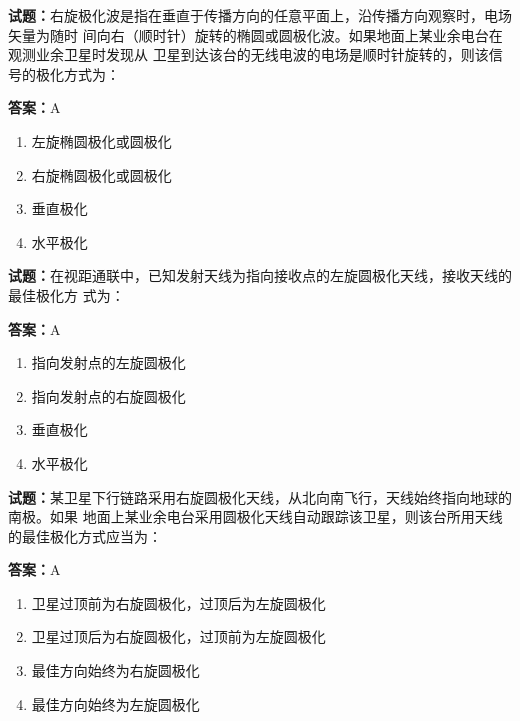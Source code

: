 \documentclass{ctexbook}
\begin{document}
\textbf{试题：}右旋极化波是指在垂直于传播方向的任意平面上，沿传播方向观察时，电场矢量为随时
间向右（顺时针）旋转的椭圆或圆极化波。如果地面上某业余电台在观测业余卫星时发现从
卫星到达该台的无线电波的电场是顺时针旋转的，则该信号的极化方式为： 

\textbf{答案：}A 

\begin{enumerate}[leftmargin=3em]
  \item 左旋椭圆极化或圆极化 

  \item 右旋椭圆极化或圆极化 

  \item 垂直极化 

  \item 水平极化 

\end{enumerate}





\vspace{1em}

\textbf{试题：}在视距通联中，已知发射天线为指向接收点的左旋圆极化天线，接收天线的最佳极化方
式为： 

\textbf{答案：}A 

\begin{enumerate}[leftmargin=3em]
  \item 指向发射点的左旋圆极化 

  \item 指向发射点的右旋圆极化 

  \item 垂直极化 

  \item 水平极化 

\end{enumerate}





\vspace{1em}

\textbf{试题：}某卫星下行链路采用右旋圆极化天线，从北向南飞行，天线始终指向地球的南极。如果
地面上某业余电台采用圆极化天线自动跟踪该卫星，则该台所用天线的最佳极化方式应当为： 

\textbf{答案：}A 


\begin{enumerate}[leftmargin=3em]
  \item 卫星过顶前为右旋圆极化，过顶后为左旋圆极化 

  \item 卫星过顶后为右旋圆极化，过顶前为左旋圆极化 

  \item 最佳方向始终为右旋圆极化 

  \item 最佳方向始终为左旋圆极化 

\end{enumerate}
\end{document}
